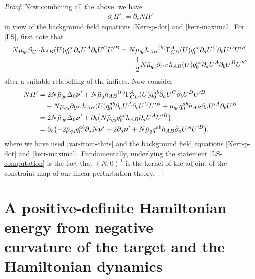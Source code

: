 \documentclass[pdftex]{sigma}
\def\ptl{\partial}%
\def\mbo#1{\boldsymbol{#1}}%
\newcommand{\leftexp}[2]{{\vphantom{#2}}^{#1}{#2}}
\def\halb{\frac{1}{2}}%
\numberwithin{equation}{section}
\begin{document}
\begin{proof}
Now combining all the above, we have
\begin{align*}
\ptl_t H'_c = \ptl_c N H'
\end{align*}
in view of the background field equations \eqref{Kerr-p-dot} and \eqref{kerr-maximal}. %
For \eqref{LS}, first note that
\begin{align}
 N \bar{\mu}_{q_0} \ptl_{U^C} h_{AB} (U) q^{ab}_0 \ptl_a U^A \ptl_b U^C U'^B &{}= N \bar{\mu}_{q_0} h_{AB}\leftexp{(h)}{\Gamma}^A_{CD} (U) q^{ab}_0 \ptl_a U^C \ptl_b U^D U'^B \notag\\
 &\quad- \halb N \bar{\mu}_{q_0} \ptl_{U^C} h_{AB}(U) q^{ab}_0 \ptl_a U^A \ptl_b U^B U'^C\label{var-from-chris}
\end{align}
after a suitable relabelling of the indices. Now consider
\begin{align} \label{LS-computation}
N H' &{}= 2N \bar{\mu}_{q_0} \Delta_0 \mbo{\nu}' + N \bar{\mu}_q h_{AB}\leftexp{(h)}{\Gamma}^A_{CD} (U) q^{ab}_0 \ptl_a U^C \ptl_b U^D U'^B \notag\\
&\quad{}- N \bar{\mu}_{q_0} \ptl_{U^C} h_{AB} (U) q^{ab}_0 \ptl_a U^A \ptl_b U^C U'^B + \bar{\mu}_{q_0} q^{ab}_0 h_{AB} \ptl_a U'^A \ptl_b U^B \notag\\
&{}= 2N \bar{\mu}_{q_0} \Delta_0 \mbo{\nu}'+ \ptl_b \bigl(N \bar{\mu}_{q_0} q_0^{ab}h_{AB} \ptl_a U^A U'^B\bigr) \notag\\
&{}= \ptl_b \bigl(-2 \bar{\mu}_{q_0} q_0^{ab} \ptl_a N \mbo{\nu}' + 2 \ptl_a \mbo{\nu}' + N \bar{\mu}_q q^{ab} h_{AB} \ptl_a U^A U'^B\bigr),
\end{align}
where we have used \eqref{var-from-chris} and the background field equations \eqref{Kerr-p-dot} and \eqref{kerr-maximal}.
Fundamentally, underlying the statement \eqref{LS-computation} is the fact that $(N, 0)^{\mathsf{T}}$ is the kernel of the adjoint of the constraint map of our linear perturbation theory.
\end{proof}

\section[A positive-definite Hamiltonian energy from negative curvature of the target\\ and~the~Hamiltonian dynamics]{A positive-definite Hamiltonian energy from negative\\ curvature of the target and the Hamiltonian dynamics}\label{section4}
\end{document}
